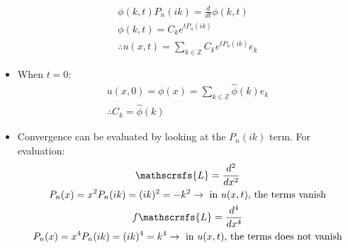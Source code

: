 \documentclass[12pt, a4paper]{article}
\begin{document}
\begin{itemize}
\begin{gather*}
        \phi(k, t)P_n(ik)= \frac{d}{dt}\phi(k, t)\\
        \phi(k, t) = C_ke^{tP_n(ik)}\\
        \therefore u(x, t) = \sum_{k \in \mathbb{Z}} C_ke^{tP_n(ik)} e_k
    \end{gather*}
    \item When $t=0$:
    \begin{gather*}
        u(x, 0) = \phi(x) = \sum_{k \in \mathbb{Z}}\hat{\phi}(k)e_k\\
        \therefore C_k = \hat{\phi}(k)
    \end{gather*}
    \item Convergence can be evaluated by looking at the $P_n(ik)$ term. For evaluation:
    \begin{gather*}
        \mathscrsfs{L} = \frac{d^2}{dx^2}\\
        P_n(x) = x^2
        P_n(ik) = (ik)^2 = -k^2 \rightarrow \text{ in $u(x, t)$, the terms vanish} \\f
        \mathscrsfs{L} = \frac{d^4}{dx^4}\\
        P_n(x) = x^4
        P_n(ik) = (ik)^4 = k^4 \rightarrow \text{ in $u(x, t)$, the terms does not vanish}
    \end{gather*}
\end{itemize}
\vspace{0.3em}
\end{document}
